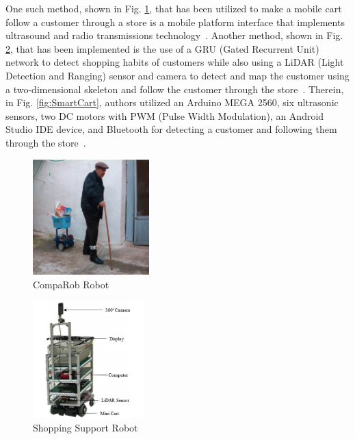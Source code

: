 \vspace*{12pt}
\noindent
One such method, shown in Fig. \ref{fig:CompaRob}, that has been utilized to make a mobile cart follow a customer through a store is a mobile platform interface that implements ultrasound and radio transmissions technology~\cite{Sales2016-CompaRob}. Another method, shown in Fig. \ref{fig:ShoppingSup}, that has been implemented is the use of a GRU (Gated Recurrent Unit) network to detect shopping habits of customers while also using a LiDAR (Light Detection and Ranging) sensor and camera to detect and map the customer using a two-dimensional skeleton and follow the customer through the store~\cite{islam_lam_fukuda_kobayashi_kuno_2019}. Therein, in Fig. \ref{fig:SmartCart}, authors utilized an Arduino MEGA 2560, six ultrasonic sensors, two DC motors with PWM (Pulse Width Modulation), an Android Studio IDE device, and Bluetooth for detecting a customer and following them through the store~\cite{Rawashdeh2017-Person}.

\begin{figure}[b]
   \centering
   \includegraphics[width=0.4\textwidth]{figs/img/CompaRob}
   \caption{CompaRob Robot}
   \label{fig:CompaRob}
\end{figure}

\begin{figure}[b]
   \centering
   \includegraphics[width=0.38\textwidth]{figs/img/ShoppingSuportRobot}
   \caption{Shopping Support Robot}
   \label{fig:ShoppingSup}
\end{figure}

